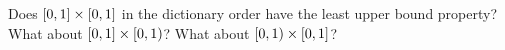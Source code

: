 \documentclass[main.tex]{subfiles}
\begin{document}
\subproblem{}\label{s03p15b}

Does \([{0},{1}]\times[{0},{1}]\) in the dictionary
order have the least upper bound property? What about
\([{0},{1}]\times[{0},{1})\)? What about
\([{0},{1})\times[{0},{1}]\)?

\todo{}
\end{document}
